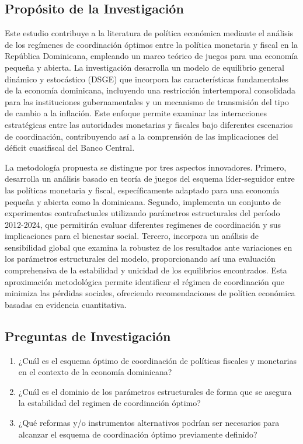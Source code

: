 \documentclass[
  authoryear,
  preprint]{elsarticle}
\begin{document}
\subsection{Propósito de la
Investigación}\label{propuxf3sito-de-la-investigaciuxf3n}

Este estudio contribuye a la literatura de política económica mediante
el análisis de los regímenes de coordinación óptimos entre la política
monetaria y fiscal en la República Dominicana, empleando un marco
teórico de juegos para una economía pequeña y abierta. La investigación
desarrolla un modelo de equilibrio general dinámico y estocástico (DSGE)
que incorpora las características fundamentales de la economía
dominicana, incluyendo una restricción intertemporal consolidada para
las instituciones gubernamentales y un mecanismo de transmisión del tipo
de cambio a la inflación. Este enfoque permite examinar las
interacciones estratégicas entre las autoridades monetarias y fiscales
bajo diferentes escenarios de coordinación, contribuyendo así a la
comprensión de las implicaciones del déficit cuasifiscal del Banco
Central.

La metodología propuesta se distingue por tres aspectos innovadores.
Primero, desarrolla un análisis basado en teoría de juegos del esquema
líder-seguidor entre las políticas monetaria y fiscal, específicamente
adaptado para una economía pequeña y abierta como la dominicana.
Segundo, implementa un conjunto de experimentos contrafactuales
utilizando parámetros estructurales del período 2012-2024, que
permitirán evaluar diferentes regímenes de coordinación y sus
implicaciones para el bienestar social. Tercero, incorpora un análisis
de sensibilidad global que examina la robustez de los resultados ante
variaciones en los parámetros estructurales del modelo, proporcionando
así una evaluación comprehensiva de la estabilidad y unicidad de los
equilibrios encontrados. Esta aproximación metodológica permite
identificar el régimen de coordinación que minimiza las pérdidas
sociales, ofreciendo recomendaciones de política económica basadas en
evidencia cuantitativa.

\subsection{Preguntas de
Investigación}\label{preguntas-de-investigaciuxf3n}

\begin{enumerate}
\def\labelenumi{\arabic{enumi}.}
\item
  ¿Cuál es el esquema óptimo de coordinación de políticas fiscales y
  monetarias en el contexto de la economía dominicana?
\item
  ¿Cuál es el dominio de los parámetros estructurales de forma que se
  asegura la estabilidad del regimen de coordinación óptimo?
\item
  ¿Qué reformas y/o instrumentos alternativos podrían ser necesarios
  para alcanzar el esquema de coordinación óptimo previamente definido?
\end{enumerate}
\end{document}
